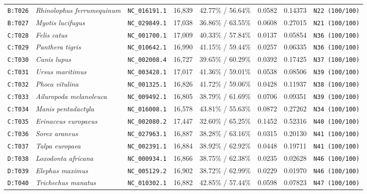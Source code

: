 \documentclass[10pt,letterpaper]{article}
\begin{document}
\begin{longtable}{llllllll}
\texttt{B:T026} & \textit{Rhinolophus ferrumequinum} & \texttt{NC\_016191.1} & 16,839 & 42.77\% / 56.64\% & 0.0582 & 0.14373 & \texttt{N22 (100/100)} \\
\texttt{B:T027} & \textit{Myotis lucifugus} & \texttt{NC\_029849.1} & 17,038 & 36.86\% / 63.55\% & 0.0608 & 0.27015 & \texttt{N21 (100/100)} \\
\texttt{C:T028} & \textit{Felis catus} & \texttt{NC\_001700.1} & 17,009 & 40.33\% / 57.84\% & 0.0137 & 0.05854 & \texttt{N36 (100/100)} \\
\texttt{C:T029} & \textit{Panthera tigris} & \texttt{NC\_010642.1} & 16,990 & 41.15\% / 59.44\% & 0.0257 & 0.06335 & \texttt{N36 (100/100)} \\
\texttt{C:T030} & \textit{Canis lupus} & \texttt{NC\_002008.4} & 16,727 & 39.65\% / 60.29\% & 0.0392 & 0.17425 & \texttt{N37 (100/100)} \\
\texttt{C:T031} & \textit{Ursus maritimus} & \texttt{NC\_003428.1} & 17,017 & 41.36\% / 59.01\% & 0.0538 & 0.08506 & \texttt{N39 (100/100)} \\
\texttt{C:T032} & \textit{Phoca vitulina} & \texttt{NC\_001325.1} & 16,826 & 41.72\% / 59.06\% & 0.0428 & 0.11937 & \texttt{N38 (100/100)} \\
\texttt{C:T033} & \textit{Ailuropoda melanoleuca} & \texttt{NC\_009492.1} & 16,805 & 38.79\% / 61.69\% & 0.0706 & 0.09351 & \texttt{N39 (100/100)} \\
\texttt{C:T034} & \textit{Manis pentadactyla} & \texttt{NC\_016008.1} & 16,578 & 43.81\% / 55.63\% & 0.0872 & 0.27262 & \texttt{N34 (100/100)} \\
\texttt{C:T035} & \textit{Erinaceus europaeus} & \texttt{NC\_002080.2} & 17,447 & 32.60\% / 65.25\% & 0.1452 & 0.52316 & \texttt{N40 (100/100)} \\
\texttt{C:T036} & \textit{Sorex araneus} & \texttt{NC\_027963.1} & 16,887 & 38.28\% / 63.16\% & 0.0315 & 0.20130 & \texttt{N41 (100/100)} \\
\texttt{C:T037} & \textit{Talpa europaea} & \texttt{NC\_002391.1} & 16,884 & 38.92\% / 62.92\% & 0.0448 & 0.19711 & \texttt{N41 (100/100)} \\
\texttt{D:T038} & \textit{Loxodonta africana} & \texttt{NC\_000934.1} & 16,866 & 38.75\% / 62.38\% & 0.0235 & 0.02628 & \texttt{N46 (100/100)} \\
\texttt{D:T039} & \textit{Elephas maximus} & \texttt{NC\_005129.2} & 16,902 & 38.72\% / 62.99\% & 0.0229 & 0.01970 & \texttt{N46 (100/100)} \\
\texttt{D:T040} & \textit{Trichechus manatus} & \texttt{NC\_010302.1} & 16,882 & 42.85\% / 57.44\% & 0.0598 & 0.07823 & \texttt{N47 (100/100)} \\

\end{longtable}
\end{document}
